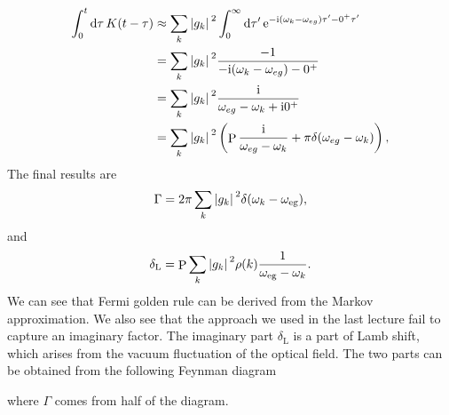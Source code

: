 \documentclass[hyperref, a4paper]{article}
\DeclareMathOperator{\primevalue}{P}
\newcommand*{\ii}{\mathrm{i}}
\newcommand*{\ee}{\mathrm{e}}
\begin{document}
\[
    \begin{aligned}
        \int_0^t \dd{\tau} K(t - \tau) &\approx \sum_k \abs*{g_k}^2 \int_0^\infty \dd{\tau'} \ee^{- \ii (\omega_k - \omega_{eg}) \tau' - 0^+ \tau'} \\
        &= \sum_k \abs*{g_k}^2 \frac{-1}{- \ii (\omega_k - \omega_{eg})  - 0^+ } \\
        &= \sum_k \abs*{g_k}^2 \frac{\ii}{\omega_{eg} - \omega_k + \ii 0^+} \\
        &= \sum_k \abs*{g_k}^2 \left( \primevalue \frac{\ii}{\omega_{eg} - \omega_k } + \pi \delta(\omega_{eg} - \omega_k) \right),
    \end{aligned}
\]
The final results are
\begin{equation}
    \Gamma = 2 \pi \sum_k \abs*{g_k}^2 \delta(\omega_k - \omega_\text{eg}),
    \label{eq:scattering-rate}
\end{equation}
and 
\begin{equation}
    \delta_\text{L} = \primevalue \sum_k \abs*{g_k}^2 \rho(k) \frac{1}{\omega_\text{eg} - \omega_k }.
    \label{eq:phase-shift}
\end{equation}
We can see that Fermi golden rule can be derived from the Markov approximation. We also see that the approach 
we used in the last lecture fail to capture an imaginary factor. The imaginary part $\delta_\text{L}$ is a part 
of Lamb shift, which arises from the vacuum fluctuation of the optical field. The two parts can be obtained 
from the following Feynman diagram 

where $\Gamma$ comes from half of the diagram.
\end{document}
